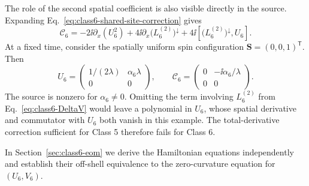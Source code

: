 The role of the second spatial coefficient is also visible directly in
the source.  Expanding Eq.~\eqref{eq:class6-shared-site-correction} gives
\begin{equation}
\mathcal C_6
=-2\ii\partial_x(U_6^2)
+4\ii\partial_x\bigl(L_6^{(2)}\bigr)^\downarrow
+4\ii\left[\bigl(L_6^{(2)}\bigr)^\downarrow,U_6\right].
\label{eq:class6-source-expanded}
\end{equation}
At a fixed time, consider the spatially uniform spin configuration
$\boldsymbol S=(0,0,1)^{\mathsf T}$.  Then
\begin{equation}
U_6=\begin{pmatrix}
1/(2\lambda)&\alpha_6\lambda\\
0&0
\end{pmatrix},
\qquad
\mathcal C_6=\begin{pmatrix}
0&-\ii\alpha_6/\lambda\\
0&0
\end{pmatrix}.
\label{eq:class6-uniform-source}
\end{equation}
The source is nonzero for $\alpha_6\ne0$.
Omitting the term involving $L_6^{(2)}$ from
Eq.~\eqref{eq:class6-DeltaV} would leave a polynomial in $U_6$, whose
spatial derivative and commutator with $U_6$ both vanish in this example.
The total-derivative correction sufficient for Class 5 therefore fails
for Class 6.

In Section~\ref{sec:class6-eom} we derive the Hamiltonian equations
independently and establish their off-shell equivalence to the
zero-curvature equation for $(U_6,V_6)$.

